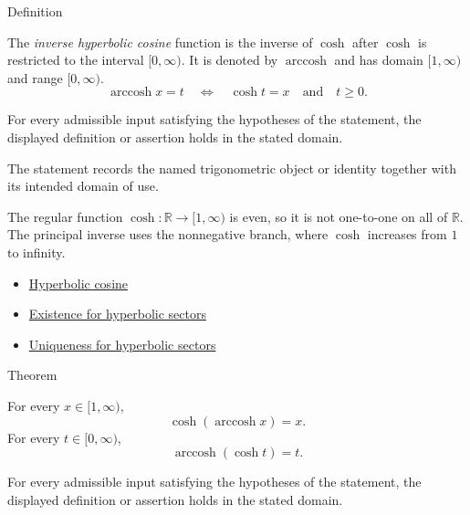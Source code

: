 

\begin{definitionbox}{Definition}
\begin{definition}
\label{def:inverse-hyperbolic-cosine}
The \emph{inverse hyperbolic cosine} function is the inverse of $\cosh$
after $\cosh$ is restricted to the interval $[0,\infty)$. It is denoted by
$\operatorname{arccosh}$ and has domain $[1,\infty)$ and range $[0,\infty)$.
\[
  \operatorname{arccosh} x=t
  \quad\Longleftrightarrow\quad
  \cosh t=x
  \quad\text{and}\quad
  t\geq 0.
\]
\end{definition}
\end{definitionbox}
\begin{remark*}
For every admissible input satisfying the hypotheses of the statement, the
displayed definition or assertion holds in the stated domain.
\end{remark*}

\begin{remark*}[Interpretation]
The statement records the named trigonometric object or identity together with
its intended domain of use.
\end{remark*}

\begin{remark*}
The regular function $\cosh:\mathbb{R}\to[1,\infty)$ is even, so it is not
one-to-one on all of $\mathbb{R}$. The principal inverse uses the
nonnegative branch, where $\cosh$ increases from $1$ to infinity.
\end{remark*}
\begin{dependencies}
\begin{itemize}
  \item \hyperref[def:hyperbolic-cosine]{Hyperbolic cosine}
  \item \hyperref[thm:hyperbolic-sector-existence]{Existence for hyperbolic sectors}
  \item \hyperref[thm:hyperbolic-sector-uniqueness]{Uniqueness for hyperbolic sectors}
\end{itemize}
\end{dependencies}

\begin{theorembox}{Theorem}
\begin{theorem}
\label{thm:inverse-hyperbolic-cosine-identities}
For every $x\in[1,\infty)$,
\[
  \cosh(\operatorname{arccosh} x)=x.
\]
For every $t\in[0,\infty)$,
\[
  \operatorname{arccosh}(\cosh t)=t.
\]
\end{theorem}
\end{theorembox}
\begin{remark*}
For every admissible input satisfying the hypotheses of the statement, the
displayed definition or assertion holds in the stated domain.
\end{remark*}

